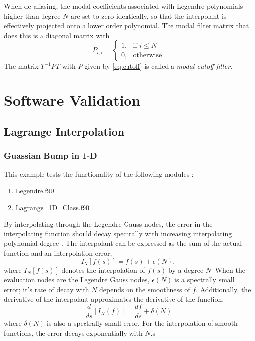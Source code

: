 \documentclass[12pt]{softwaremanual}
\begin{document}
When de-aliasing, the modal coefficients associated with Legendre polynomials higher than degree $N$ are set to zero identically, so that the interpolant is effectively projected onto a lower order polynomial. The modal filter matrix that does this is a diagonal matrix with
\begin{equation}
P_{i,i} = 
\begin{cases}
     1, & \text{if } i \leq N \\
     0, & \text{otherwise}
\end{cases}\label{eq:cutoff}
\end{equation}
The matrix $T^{-1}PT$ with $P$ given by \eqref{eq:cutoff} is called a \textit{modal-cutoff filter}.

\chapter{Software Validation}
\section{Lagrange Interpolation}

\subsection{ Guassian Bump in 1-D }
 This example tests the functionality of the following modules :
 \begin{enumerate}
 \item Legendre.f90
 \item Lagrange\_1D\_Class.f90
 \end{enumerate}
 By interpolating through the Legendre-Gauss nodes, the error in the interpolating function should decay spectrally with increasing interpolating polynomial degree \citep{Kopriva2009}. The interpolant can be expressed as the sum of the actual function and an interpolation error, 
\begin{equation}
I_N[ f(s) ] = f(s)  + \epsilon(N),
\end{equation} 
where $I_N[ f(s) ]$ denotes the interpolation of $f(s)$ by a degree $N$. When the evaluation nodes are the Legendre Gauss nodes, $\epsilon(N)$ is a spectrally small error; it's rate of decay with $N$ depends on the smoothness of $f$. Additionally, the derivative of the interpolant approximates the derivative of the function. 
  \begin{equation}
  \frac{d}{ds}[ I_N(f) ] = \frac{df}{ds} + \delta(N)
  \end{equation}
 where $\delta(N)$ is also a spectrally small error. For the interpolation of smooth functions, the error decays exponentially with $N$.s
 
\end{document}
